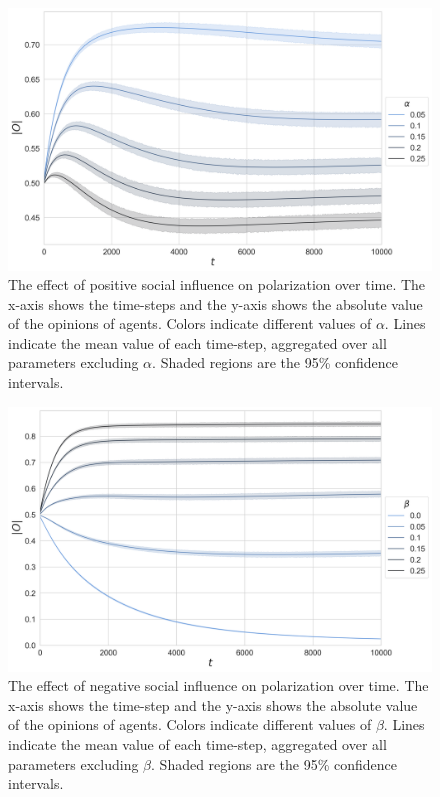 \documentclass[11pt]{article}
\begin{document}
\begin{figure}[H]
    \centering
    \includegraphics[width=.7\linewidth]{../plots/overall/Absolute_Opinion_Positive_Learning_Rate.png}
  \caption{The effect of positive social influence on polarization over time. The x-axis shows the time-steps and the y-axis shows the absolute value of the opinions of agents. Colors indicate different values of $\alpha$. Lines indicate the mean value of each time-step, aggregated over all parameters excluding $\alpha$. Shaded regions are the 95\% confidence intervals.}
  \label{appendix:alpha}
\end{figure}

\begin{figure}[H]
    \centering
    \includegraphics[width=.7\linewidth]{../plots/overall/Absolute_Opinion_Negative_Learning_Rate.png}
  \caption{The effect of negative social influence on polarization over time. The x-axis shows the time-step and the y-axis shows the absolute value of the opinions of agents. Colors indicate different values of $\beta$. Lines indicate the mean value of each time-step, aggregated over all parameters excluding $\beta$. Shaded regions are the 95\% confidence intervals.}
  \label{appendix:beta}
\end{figure}
\end{document}
